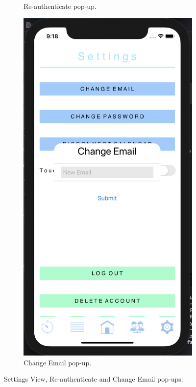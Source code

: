 \begin{figure}[H]
\begin{subfigure}[b]{0.3\textwidth}
        \caption{Re-authenticate pop-up.}
        \label{fig:reauth_app}
    \end{subfigure}
    \hfill
    \begin{subfigure}[b]{0.3\textwidth}
        \centering
        \includegraphics[width=\textwidth]{./graphics/Implementation/Settings/change email.png}
        \caption{Change Email pop-up.}
        \label{fig:change_email_app}
    \end{subfigure}
    
    \caption{Settings View, Re-authenticate and Change Email pop-ups.}
    \label{fig:settings_reauth_change_email}
\end{figure}
